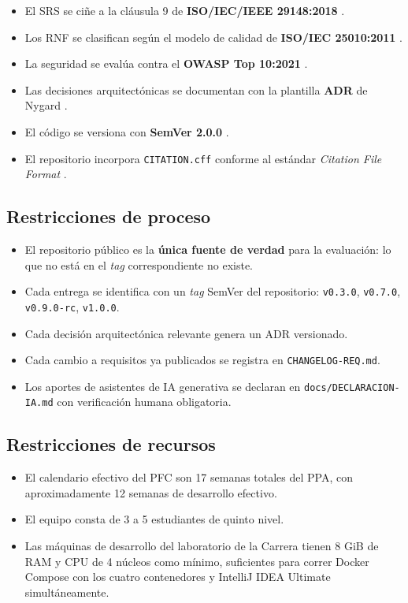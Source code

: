 \documentclass[11pt,a4paper,twoside]{report}
\begin{document}
\begin{itemize}[leftmargin=1.5em,itemsep=2pt]
    \item El SRS se ci\~ne a la cl\'ausula 9 de \textbf{ISO/IEC/IEEE 29148:2018} \cite{iso29148}.
    \item Los RNF se clasifican seg\'un el modelo de calidad de \textbf{ISO/IEC 25010:2011} \cite{iso25010}.
    \item La seguridad se eval\'ua contra el \textbf{OWASP Top 10:2021} \cite{owasp2021top10}.
    \item Las decisiones arquitect\'onicas se documentan con la plantilla \textbf{ADR} de Nygard \cite{nygard2011adr}.
    \item El c\'odigo se versiona con \textbf{SemVer 2.0.0} \cite{prestonwerner2013semver}.
    \item El repositorio incorpora \texttt{CITATION.cff} conforme al est\'andar \emph{Citation File Format} \cite{druskat2021cff}.
\end{itemize}

\subsection{Restricciones de proceso}

\begin{itemize}[leftmargin=1.5em,itemsep=2pt]
    \item El repositorio p\'ublico es la \textbf{\'unica fuente de verdad} para la evaluaci\'on: lo que no est\'a en el \emph{tag} correspondiente no existe.
    \item Cada entrega se identifica con un \emph{tag} SemVer del repositorio: \texttt{v0.3.0}, \texttt{v0.7.0}, \texttt{v0.9.0-rc}, \texttt{v1.0.0}.
    \item Cada decisi\'on arquitect\'onica relevante genera un ADR versionado.
    \item Cada cambio a requisitos ya publicados se registra en \texttt{CHANGELOG-REQ.md}.
    \item Los aportes de asistentes de IA generativa se declaran en \texttt{docs/DECLARACION-IA.md} con verificaci\'on humana obligatoria.
\end{itemize}

\subsection{Restricciones de recursos}

\begin{itemize}[leftmargin=1.5em,itemsep=2pt]
    \item El calendario efectivo del PFC son 17 semanas totales del PPA, con aproximadamente 12 semanas de desarrollo efectivo.
    \item El equipo consta de 3 a 5 estudiantes de quinto nivel.
    \item Las m\'aquinas de desarrollo del laboratorio de la Carrera tienen 8 GiB de RAM y CPU de 4 n\'ucleos como m\'inimo, suficientes para correr Docker Compose con los cuatro contenedores y IntelliJ IDEA Ultimate simult\'aneamente.
\end{itemize}
\end{document}
